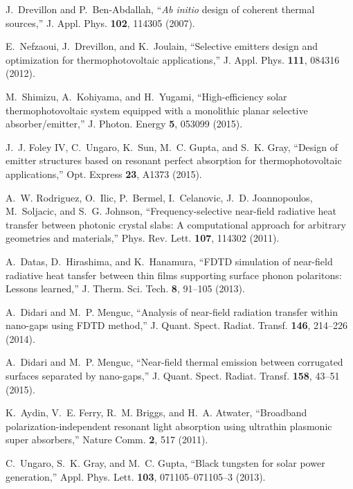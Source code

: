 \documentclass[10pt,letterpaper]{article}
\begin{document}
\begin{thebibliography}{100}
J.~Drevillon and P.~Ben-Abdallah, \enquote{{\it Ab initio} design of coherent
  thermal sources,} J. Appl. Phys. \textbf{102}, 114305 (2007).

E.~Nefzaoui, J.~Drevillon, and K.~Joulain, \enquote{Selective emitters design
  and optimization for thermophotovoltaic applications,} J. Appl. Phys.
  \textbf{111}, 084316 (2012).

M.~Shimizu, A.~Kohiyama, and H.~Yugami, \enquote{{High-efficiency solar
  thermophotovoltaic system equipped with a monolithic planar selective
  absorber/emitter},} J. Photon. Energy \textbf{5}, 053099 (2015).

J.~J. {Foley IV}, C.~Ungaro, K.~Sun, M.~C. Gupta, and S.~K. Gray,
  \enquote{Design of emitter structures based on resonant perfect absorption
  for thermophotovoltaic applications,} Opt. Express \textbf{23}, A1373 (2015).

A.~W. Rodriguez, O.~Ilic, P.~Bermel, I.~Celanovic, J.~D. Joannopoulos,
  M.~Soljacic, and S.~G. Johnson, \enquote{Frequency-selective near-field
  radiative heat transfer between photonic crystal slabs: A computational
  approach for arbitrary geometries and materials,} Phys. Rev. Lett.
  \textbf{107}, 114302 (2011).

A.~Datas, D.~Hirashima, and K.~Hanamura, \enquote{{FDTD} simulation of
  near-field radiative heat tansfer between thin films supporting surface
  phonon polaritons: Lessons learned,} J. Therm. Sci. Tech. \textbf{8}, 91--105
  (2013).

A.~Didari and M.~P. Menguc, \enquote{Analysis of near-field radiation transfer
  within nano-gaps using {FDTD} method,} J. Quant. Spect. Radiat. Transf.
  \textbf{146}, 214--226 (2014).

A.~Didari and M.~P. Menguc, \enquote{Near-field thermal emission between
  corrugated surfaces separated by nano-gaps,} J. Quant. Spect. Radiat. Transf.
  \textbf{158}, 43--51 (2015).

K.~Aydin, V.~E. Ferry, R.~M. Briggs, and H.~A. Atwater, \enquote{Broadband
  polarization-independent resonant light absorption using ultrathin plasmonic
  super absorbers,} Nature Comm. \textbf{2}, 517 (2011).

C.~Ungaro, S.~K. Gray, and M.~C. Gupta, \enquote{Black tungsten for solar power
  generation,} Appl. Phys. Lett. \textbf{103}, 071105--071105--3 (2013).


\end{thebibliography}
\end{document}
